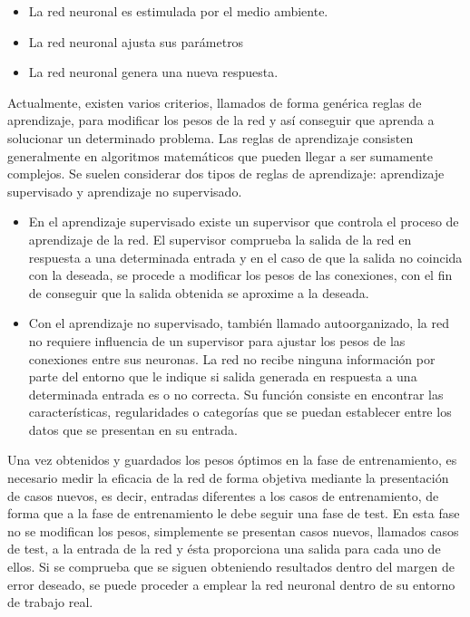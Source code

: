\documentclass[a4paper, 12pt, spanish, chapterprefix, numbers=noenddot]{book}
\begin{document}
\begin{itemize}
\item La red neuronal es estimulada por el medio ambiente.
\item La red neuronal ajusta sus parámetros
\item La red neuronal genera una nueva respuesta.
\end{itemize}

Actualmente, existen varios criterios, llamados de forma genérica reglas de aprendizaje, para modificar los pesos de la red y así conseguir que aprenda a solucionar un determinado problema. Las reglas de aprendizaje consisten generalmente en algoritmos matemáticos que pueden llegar a ser sumamente complejos. Se suelen considerar dos tipos de reglas de aprendizaje: aprendizaje supervisado y aprendizaje no supervisado.

\begin{itemize}
\item En el aprendizaje supervisado existe un supervisor que controla el proceso de aprendizaje de la red. El supervisor comprueba la salida de la red en respuesta a una determinada entrada y en el caso de que la salida no coincida con la deseada, se procede a modificar los pesos de las conexiones, con el fin de conseguir que la salida obtenida se aproxime a la deseada.
\item Con el aprendizaje no supervisado, también llamado autoorganizado, la red no requiere influencia de un supervisor para ajustar los pesos de las conexiones entre sus neuronas. La red no recibe ninguna información por parte del entorno que le indique si salida generada en respuesta a una determinada entrada es o no correcta. Su función consiste en encontrar las características, regularidades o categorías que se puedan establecer entre los datos que se presentan en su entrada.
\end{itemize}

Una vez obtenidos y guardados los pesos óptimos en la fase de entrenamiento, es necesario medir la eficacia de la red de forma objetiva mediante la presentación de casos nuevos, es decir, entradas diferentes a los casos de entrenamiento, de forma que a la fase de entrenamiento le debe seguir una fase de test. En esta fase no se modifican los pesos, simplemente se presentan casos nuevos, llamados casos de test, a la entrada de la red y ésta proporciona una salida para cada uno de ellos. Si se comprueba que se siguen obteniendo resultados dentro del margen de error deseado, se puede proceder a emplear la red neuronal dentro de su entorno de trabajo real.
\end{document}
